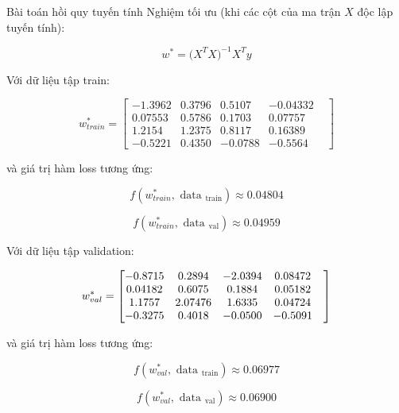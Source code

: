 \documentclass[10pt]{beamer}
\theoremstyle{remark}
\theoremstyle{definition}
\begin{document}
\begin{frame}[allowframebreaks]{Bài toán hồi quy tuyến tính}
	\framebreak
	Nghiệm tối ưu (khi các cột của ma trận $X$ độc lập tuyến tính):

	\begin{equation*}
		w^{*} = \Big(X^T X \Big)^{-1}X^T y
	\end{equation*}

	Với dữ liệu tập train:

	\begin{equation*}
		w_{train}^{*} = \begin{bmatrix} -1.3962 &  0.3796 & 0.5107 & -0.04332 &\\ 0.07553 & 0.5786 & 0.1703 & 0.07757 &\\ 1.2154  & 1.2375 &  0.8117  & 0.16389 &\\ -0.5221 &  0.4350 & -0.0788 & -0.5564 \end{bmatrix}
	\end{equation*}

	và giá trị hàm loss tương ứng:

	\begin{equation*}
		f(w_{train}^{*}, \text{ data }_{\text{train}}) \approx 0.04804
	\end{equation*}

	\begin{equation*}
		f(w_{train}^{*}, \text{ data }_{\text{val}}) \approx 0.04959
	\end{equation*}

	\framebreak
	
	Với dữ liệu tập validation:

	\begin{equation*}
		\centering
		w_{val}^{*} = \begin{bmatrix} -0.8715 &  0.2894 & -2.0394 & 0.08472 &\\ 0.04182 &  0.6075 & 0.1884 &  0.05182 &\\ 1.1757 &   2.07476 &    1.6335  & 0.04724 & \\ -0.3275 & 0.4018 & -0.0500 & -0.5091  \end{bmatrix}
	\end{equation*}

	và giá trị hàm loss tương ứng:

	\begin{equation*}
		f(w_{val}^{*}, \text{ data }_{\text{train}}) \approx 0.06977
	\end{equation*}

	\begin{equation*}
		f(w_{val}^{*}, \text{ data }_{\text{val}}) \approx 0.06900
	\end{equation*}
\end{frame}
\end{document}
